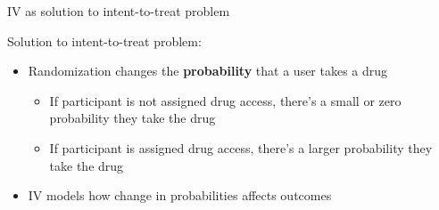 \documentclass[compress, 8pt]{beamer}
\begin{document}
\begin{frame}{IV as solution to intent-to-treat problem}

Solution to intent-to-treat problem:
\begin{itemize}
    \item Randomization changes the \textbf{probability} that a user takes a drug
    \begin{itemize}
        \item If participant is not assigned drug access, there's a small or zero probability they take the drug
        \item If participant is assigned drug access, there's a larger probability they take the drug
    \end{itemize}
    \item [$\implies$] IV models how change in probabilities affects outcomes
\end{itemize}

\end{frame}
\end{document}
